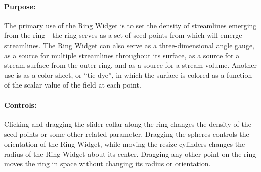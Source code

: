 \paragraph{Purpose:} The primary use of the Ring Widget is to set the
density of streamlines emerging from the ring---the ring serves as a set of
seed points from which will emerge streamlines.  The Ring Widget can also
serve as a three-dimensional angle gauge, as a source for multiple
streamlines throughout its surface, as a source for a stream surface from
the outer ring, and as a source for a stream volume.  Another use is as a
color sheet, or ``tie dye'', in which the surface is colored as a function of
the scalar value of the field at each point.

\paragraph{Controls: } Clicking and dragging the slider collar along the
ring changes the density of the seed points or some other related
parameter.  Dragging the spheres controls the orientation of the Ring
Widget, while moving the resize cylinders changes the radius of the Ring
Widget about its center.  Dragging any other point on the ring moves the
ring in space without changing its radius or orientation.


